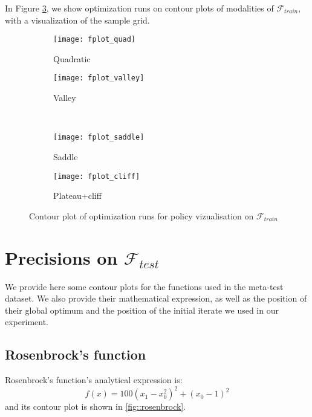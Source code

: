 {{		In Figure \ref{fig::policy_seq_contour}, we show optimization runs on contour plots of modalities of $\mathcal{F}_{train}$, with a visualization of the sample grid. 
		\begin{figure}
			\centering
			\begin{subfigure}[b]{0.4\linewidth}
			{
				\centering
				\texttt{[image: fplot\_quad]}
				\caption{Quadratic}
			}
			\end{subfigure}
			\begin{subfigure}[b]{0.4\linewidth}
			{
				\centering
				\texttt{[image: fplot\_valley]}
				\caption{Valley}
			}
			\end{subfigure}\\
			\begin{subfigure}[b]{0.4\linewidth}
			{
				\centering
				\texttt{[image: fplot\_saddle]}
				\caption{Saddle}
				\label{fig::policy_seq_saddle}
			}
			\end{subfigure}
			\begin{subfigure}[b]{0.4\linewidth}
			{
				\centering
				\texttt{[image: fplot\_cliff]}
				\caption{Plateau+cliff}
				\label{fig::policy_seq_cliff}
			}
			\end{subfigure}
			\caption{Contour plot of optimization runs for policy vizualisation on $\mathcal{F}_{train}$}
			\label{fig::policy_seq_contour}
		\end{figure}
		
	}
	
	
	\section{Precisions on $\mathcal{F}_{test}$}
	{
		\label{sec::ftest}
		We provide here some contour plots for the functions used in the meta-test dataset. We also provide their mathematical expression, as well as the position of their global optimum and the position of the initial iterate we used in our experiment. 
		
		\subsection*{Rosenbrock's function}
		{
			Rosenbrock's function's analytical expression is:
			\begin{equation}
				f(x) = 100(x_1-x_0^2)^2 + (x_0-1)^2
			\end{equation}
			and its contour plot is shown in \ref{fig::rosenbrock}.
			
}}}
